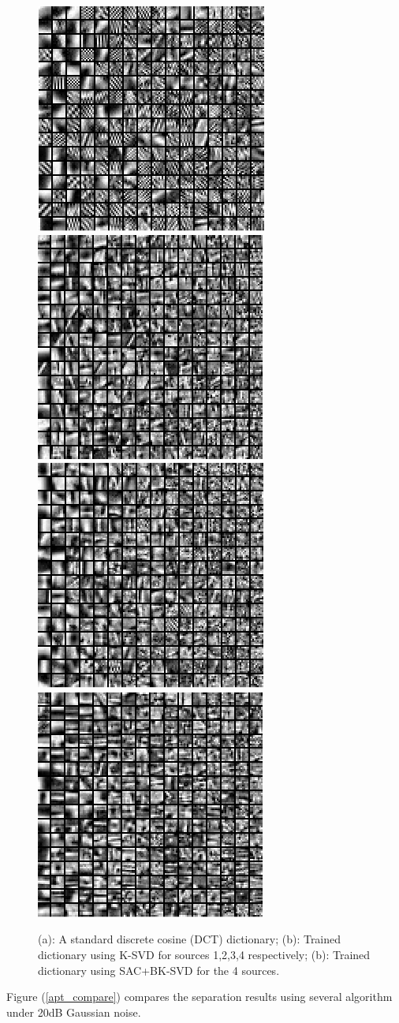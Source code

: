 \begin{figure}[!htbp]
{\begin{minipage}[b]{0.99\linewidth}
\includegraphics[width=0.23\linewidth]{images/block_dict1.png}\vspace{4pt}
\includegraphics[width=0.23\linewidth]{images/blockdict2.png}\vspace{4pt}
\includegraphics[width=0.23\linewidth]{images/blockdict3.png}\vspace{4pt}
\includegraphics[width=0.23\linewidth]{images/blockdict4.png}
\end{minipage}}
\caption{(a): A standard discrete cosine (DCT) dictionary; (b): Trained dictionary using K-SVD for sources 1,2,3,4 respectively; (b): Trained dictionary using SAC+BK-SVD for the 4 sources.}
\label{dictionary_learned}
\end{figure}

Figure (\ref{apt_compare}) compares the separation results
using several algorithm under 20dB Gaussian noise. \\


